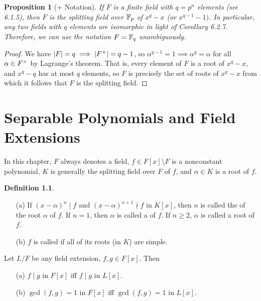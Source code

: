 \documentclass[11pt]{book}
\newcounter{counter}
\newtheorem{proposition}[counter]{Proposition}   \newtheorem{problem}[counter]{Problem}   \newtheorem*{proposition*}{Proposition}   \newtheorem*{lemma*}{Lemma}
\theoremstyle{definition}   \newtheorem{defn}[counter]{Definition} %
\newcommand{\bs}{\setminus}   \newcommand{\A}{\mathcal{A}}   \newcommand{\sy}{\textnormal{Syl}}   \newcommand{\size}[1]{\left| #1 \right|}
\newcommand{\vs}{\vspace{8pt}}   \newcommand{\hs}{\hspace{8pt}}
\numberwithin{counter}{chapter}
\begin{document}
\vs

\begin{proposition}[+ Notation]
If $F$ is a finite field with $q = p^n$ elements (see 6.1.5), then $F$ is the splitting field over $\mathbb{F}_p$ of $x^q-x$ (or $x^{q-1}-1)$. In particular, any two fields with $q$ elements are isomorphic in light of Corollary 6.2.7. Therefore, we can use the notation $F = \mathbb{F}_q$ unambiguously. 
\end{proposition}

\begin{proof}
We have $|F| = q \implies |F^{\times}| = q-1$, so $\alpha^{q-1} = 1 \implies \alpha^q = \alpha$ for all $\alpha \in F^{\times}$ by Lagrange's theorem. That is, every element of $F$ is a root of $x^q-x$, and $x^q-q$ has at most $q$ elements, so $F$ is precisely the set of roots of $x^q-x$ from which it follows that $F$ is the splitting field. 
\end{proof}




\chapter{Separable Polynomials and Field Extensions}



In this chapter, $F$ always denotes a field, $f \in F[x] \bs F$ is a nonconstant polynomial, $K$ is generally the splitting field over $F$ of $f$, and $\alpha \in K$ is a root of $f$. 
 
 
 \vs
 
 \begin{defn}\ 
 \begin{enumerate}
 \item[(a)] If $(x-\alpha)^n \mid f$ and $(x-\alpha)^{n+1} \nmid f$ in $K[x]$, then $n$ is called the  of the root $\alpha$ of $f$. If $n = 1$, then $\alpha$ is called a  of $f$. If $n \geq 2$, $\alpha$ is called a  root of $f$.
 \item[(b)] $f$ is called \tb{separable} if all of its roots (in $K$) are simple.  
 \end{enumerate}
 \end{defn}
 
 \vs
 
 \begin{lemma}
 Let $L/F$ be any field extension, $f,g \in F[x]$. Then
 \begin{enumerate}
 \item[(a)] $f \mid g$ in $F[x]$ iff $f \mid g$ in $L[x]$. 
 \item[(b)] $\gcd(f,g) = 1$ in $F[x]$ iff $\gcd(f,g) = 1$ in $L[x]$. 
 \end{enumerate}
 \end{lemma}
 
\end{document}
